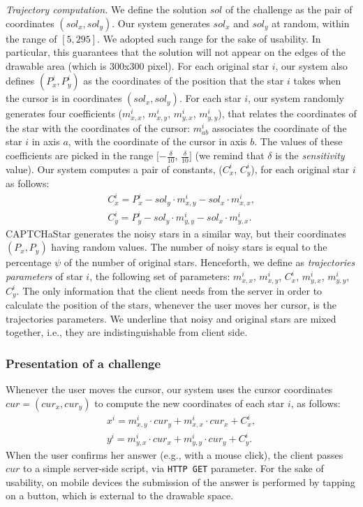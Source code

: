 \documentclass[conference]{IEEEtran}
\begin{document}
\noindent\textit{Trajectory computation.}
We define the solution $sol$ of the challenge as the pair of coordinates $({sol}_x,{sol}_y)$.
Our system generates ${sol}_x$ and ${sol}_y$ at random, within the range of $[5,295]$.
We adopted such range for the sake of usability.
In particular, this guarantees that the solution will not appear on the edges of the drawable area (which is $300$x$300$ pixel).
For each original star $i$, our system also defines $(P^i_x,P^i_y)$ as the coordinates of the position that the star $i$ takes when the cursor is in coordinates $({sol}_x,{sol}_y)$.  For each star $i$, our system randomly generates four coefficients ($m^i_{x,x}$, $m^i_{x,y}$, $m^i_{y,x}$, $m^i_{y,y}$),
that relates the coordinates of the star with the coordinates of the cursor: $m^i_{ab}$ associates the coordinate of the star $i$ in axis $a$, with the coordinate of the cursor in axis $b$.
The values of these coefficients are picked in the range $[-\frac{\delta}{10}$, $\frac{\delta}{10}]$ (we remind that $\delta$ is the \textit{sensitivity} value).
Our system computes a pair of constants, ($C^i_x$, $C^i_y$), for each original star $i$ as follows:
\begin{gather*}
C^i_x = P^i_x-{sol}_y\cdot{m^i_{x,y}}-{sol}_x\cdot{m^i_{x,x}},\\
C^i_y = P^i_y-{sol}_y\cdot{m^i_{y,y}}-{sol}_x\cdot{m^i_{y,x}}.
\end{gather*}
CAPTCHaStar generates the noisy stars in a similar way, but their coordinates $(P_x,P_y)$ having random values. The number of noisy stars is equal to the percentage $\psi$ of the number of original stars.
Henceforth, we define as \textit{trajectories parameters} of star $i$, the following set of parameters: $m^i_{x,x}$, $m^i_{x,y}$, $C^i_x$, $m^i_{y,x}$, $m^i_{y,y}$, $C^i_y$.
The only information that the client needs from the server in order to calculate the position of the stars, whenever the user moves her cursor, is the trajectories parameters.
We underline that noisy and original stars are mixed together, i.e., they are indistinguishable from client side. \subsubsection{Presentation of a challenge}
Whenever the user moves the cursor, our system uses the cursor coordinates $cur=(cur_x, cur_y)$ to compute the new coordinates of each star $i$, as follows:
\begin{gather*}
x^i=m^i_{x,y}\cdot {cur_y}+m^i_{x,x}\cdot {cur_x}+C^i_x,\\
y^i=m^i_{y,x}\cdot {cur_x}+m^i_{y,y}\cdot {cur_y}+C^i_y.
\end{gather*}
When the user 
confirms her answer (e.g., with a mouse click), the client passes $cur$ to a simple server-side script, via \texttt{HTTP GET} parameter.
For the sake of usability, on mobile devices the submission of the answer is performed by tapping on a button, which is external to the drawable space.
\end{document}
